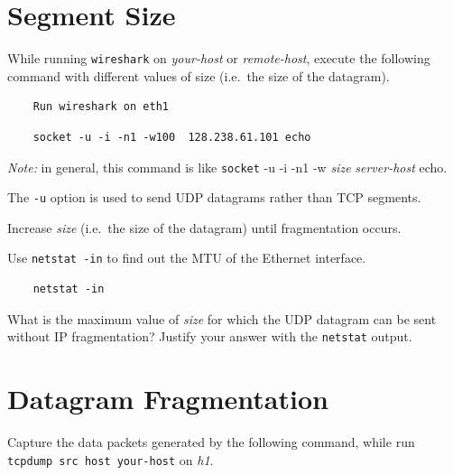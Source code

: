 \documentclass{UTNetLab}
\begin{document}
\section{Segment Size}
    While running \lstinline{wireshark} on \textit{your-host} or \textit{remote-host}, execute the following command with different values of size (i.e.\  the size of the datagram).
    
    \begin{lstlisting}
    Run wireshark on eth1

    \end{lstlisting}

   \begin{lstlisting}
    socket -u -i -n1 -w100  128.238.61.101 echo
   \end{lstlisting}

 \textit{Note: }in general, this command is like \lstinline{socket} -u -i -n1 -w \textit{size} \textit{server-host} echo. 
    
    The \lstinline{-u} option is used to send UDP datagrams rather than TCP segments.

    Increase \textit{size} (i.e.\  the size of the datagram) until fragmentation occurs.

    Use \lstinline{netstat -in} to find out the MTU of the Ethernet interface.
    
    
    \begin{lstlisting}
    netstat -in
    \end{lstlisting}
    \begin{report}
    \item What is the maximum value of \textit{size} for which the UDP datagram can be sent without IP fragmentation?
    Justify your answer with the \lstinline{netstat} output.
    \end{report}

\section{Datagram Fragmentation}
    Capture the data packets generated by the following command, while run \lstinline[emph={your-host, remote-host}]{tcpdump src host your-host} on \textit{h1}.
     
\end{document}
